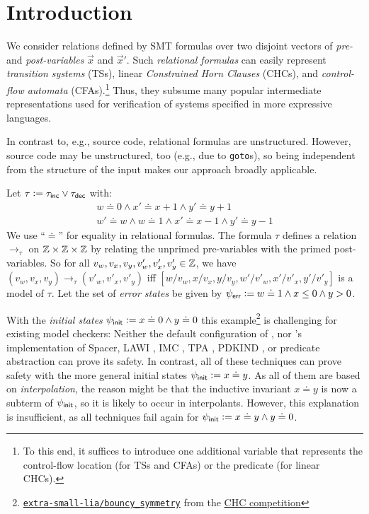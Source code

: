 \section{Introduction}
\label{sec:intro}
\label{sec:overview}

We consider relations defined by SMT formulas over two disjoint vectors of \emph{pre-} and \emph{post-variables} $\vec{x}$ and $\vec{x}'$.
%
Such \emph{relational formulas} can easily represent \emph{transition systems}
(TSs), linear \emph{Constrained Horn Clauses} (CHCs), and \emph{control-flow automata}
(CFAs).\footnote{To this end, it suffices to introduce one additional variable that represents the control-flow location (for TSs and CFAs) or the predicate (for linear CHCs).}
Thus, they subsume many popular intermediate representations used for verification of systems specified in more expressive languages.

In contrast to, e.g., source code, relational formulas are unstructured.
%
However, source code may be unstructured, too (e.g., due to {\tt goto}s), so being independent from the structure of the input makes our approach broadly applicable.

\begin{example}
  \label{ex:ex1}
  Let $\tau \mathrel{\mathop:}= \tau_{\mathsf{inc}} \lor \tau_{\mathsf{dec}}$ with:
  \begin{align*}
    w \doteq 0 \land x' \doteq x + 1 \land y' \doteq y + 1 \tag{$\tau_\inc$} \\
    w' \doteq w \land w \doteq 1 \land x' \doteq x - 1 \land y' \doteq y - 1 \tag{$\tau_\dec$}
  \end{align*}
  We use ``$\doteq$'' for equality in relational formulas.
  The formula $\tau$ defines a relation $\to_{\tau}$ on $\mathbb{Z} \times \mathbb{Z} \times \mathbb{Z}$ by relating the unprimed pre-variables with the primed post-variables.
  So for all $v_w,v_x,v_y, v'_w,v'_x, v'_y \in \mathbb{Z}$, we have $(v_w,v_x,v_y) \to_{\tau} (v'_w,v'_x, v'_y)$ iff $[w/v_w,x/v_x,y/v_y,w'/v'_w,x'/v'_x,y'/v'_y]$ is a model of $\tau$.
  Let the set of \emph{error states} be given by $\psi_{\mathsf{err}} \mathrel{\mathop:}= w \doteq 1 \land x \leq 0 \land y > 0$.
\end{example}
%
With the \emph{initial states} $\psi_{\mathsf{init}} \mathrel{\mathop:}= x \doteq 0 \land y \doteq 0$ this example\footnote{\href{https://github.com/chc-comp/extra-small-lia/blob/master/bouncy_symmetry.smt2}{\tt extra-small-lia/bouncy\_symmetry} from the \href{https://github.com/orgs/chc-comp/repositories}{CHC competition}}
is challenging for existing model checkers:
%
Neither the default configuration of  \cite{z3,spacer}, nor 's \cite{golem} implementation of Spacer, LAWI \cite{lawi}, IMC \cite{imc}, TPA \cite{tpa-multiloop},
PDKIND \cite{pdkind}, or predicate abstraction \cite{predicate_abstraction} can prove its safety.
%
In contrast, all of these techniques\paper{\pagebreak[3]} can prove safety with the more general initial states $\psi_{\mathsf{init}} \mathrel{\mathop:}= x \doteq y$.
%
As all of them are based on \emph{interpolation}, the reason might be that the inductive invariant $x \doteq y$ is now a subterm of $\psi_{\mathsf{init}}$, so it is likely to occur in interpolants.
%
However, this explanation is insufficient, as all techniques fail again for $\psi_{\mathsf{init}} \mathrel{\mathop:}= x \doteq y \land y \doteq 0$.

